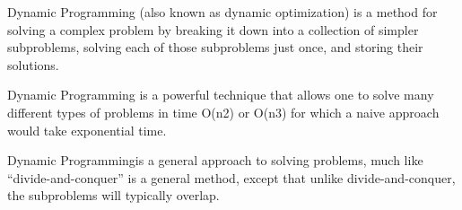 
\begin{frame}

Dynamic Programming (also known as dynamic optimization) is a method for solving a complex problem by breaking it down into a collection of simpler subproblems, solving each of those subproblems just once, and storing their solutions.

Dynamic Programming is a powerful technique that allows one to solve many different types of
problems in time O(n2) or O(n3) for which a naive approach would take exponential time. 

Dynamic Programmingis a general approach to solving problems, much like “divide-and-conquer” is a general
method, except that unlike divide-and-conquer, the subproblems will typically overlap.

\end{frame}